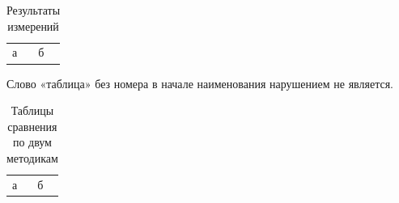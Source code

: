 \begin{table}
  \caption{Результаты измерений}
  \begin{tabular}{ll}
    а & б \\
  \end{tabular}
\end{table}

Слово «таблица» без номера в начале наименования нарушением не является.

\begin{table}
  \caption{Таблицы сравнения по двум методикам}
  \begin{tabular}{ll}
    а & б \\
  \end{tabular}
\end{table}
